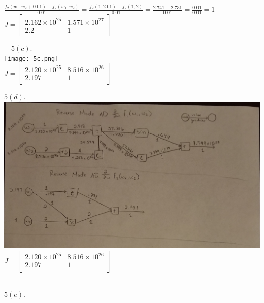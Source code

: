 \documentclass[11pt,english]{article}
\begin{document}
	$\frac{f_2(w_1, w_2 + 0.01) - f_2(w_1, w_2)}{0.01} = \frac{f_2(1, 2.01) - f_2(1, 2)}{0.01} = \frac{2.741 - 2.731}{0.01} = \frac{0.01}{0.01} = 1$\\
	
	$J = \begin{bmatrix}
	2.162\times 10^{25} & 
	1.571\times 10^{27} \\[1ex] %
	2.2 & 
	1
	\end{bmatrix}$\\
	\pagebreak
	
	$\quad 5(c).$\\
	
	\texttt{[image: 5c.png]}\\
	
	$J = \begin{bmatrix}
	2.120\times 10^{25} & 8.516\times 10^{26} \\
	2.197 & 1 \\[1ex] %
	\end{bmatrix}$\\
	\pagebreak
	
	$5(d).$\\
	
	\includegraphics[scale=0.2]{5d.jpg}\\
	
	$J = \begin{bmatrix}
	2.120\times 10^{25} & 8.516\times 10^{26} \\
	2.197 & 1 \\[1ex] %
	\end{bmatrix}$\\\\
	\pagebreak
	
	$5(e).$\\
	
\end{document}

